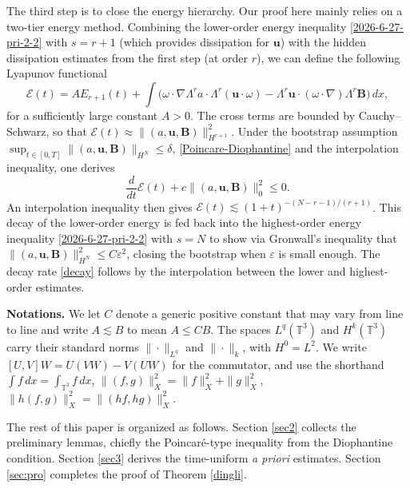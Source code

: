 \documentclass[12pt, reqno]{amsart}
\numberwithin{equation}{section}
\numberwithin{equation}{section}
\numberwithin{equation}{section}
\numberwithin{equation}{section}
\theoremstyle{remark}
\def\u{ \mathbf{u} }
\def\b{ \mathbf{B} }
\begin{document}
\medskip
The third step is to close the energy hierarchy. Our proof here mainly relies on a two-tier
energy method. Combining the  lower-order energy inequality \eqref{2026-6-27-pri-2-2} with $s=r+1$ (which provides dissipation for $\u$) with the hidden dissipation estimates from the first step (at order $r$),
we can  define the  following Lyapunov functional
\[
{\mathcal{E}(t)}=AE_{r+1}(t)+\int \Big(\omega\cdot\nabla\Lambda^{r}a\cdot\Lambda^{r}(\u\cdot\omega)-\Lambda^{r}\u\cdot(\omega\cdot\nabla)\Lambda^{r}\b\Big) \,dx,
\]
for a sufficiently large constant $A>0$.  The cross terms are bounded by
Cauchy--Schwarz, so that
$\mathcal{E}(t)\approx\|(a,\mathbf{u},\b)\|_{H^{r+1}}^2$.
Under the bootstrap assumption
$\sup_{t\in[0,T]}\|(a,\mathbf{u},\b)\|_{H^N}\leq\delta$, \eqref{Poincare-Diophantine} and the interpolation inequality, one
derives
\[
\frac{d}{dt}\mathcal{E}(t) + c\|(a,\mathbf{u},\b)\|_{0}^2 \leq 0.
\]
An interpolation inequality then gives $\mathcal{E}(t)\lesssim (1+t)^{-(N-r-1)/(r+1)}$.
This decay of the lower-order energy is fed back into the highest-order
energy inequality \eqref{2026-6-27-pri-2-2} with $s=N$ to show via Gronwall's inequality that
$\|(a,\mathbf{u},\b)\|_{H^N}^2\leq C\varepsilon^2$, closing the
bootstrap when $\varepsilon$ is small enough.  The decay rate
\eqref{decay} follows by  the interpolation between the lower and
highest-order estimates.

\medskip
\noindent\textbf{Notations.}
We let $C$ denote a generic positive constant that may vary from line to
line and write $A\lesssim B$ to mean $A\leq CB$.  The spaces
$L^q(\mathbb{T}^3)$ and $H^k(\mathbb{T}^3)$ carry their standard norms
$\|\cdot\|_{L^q}$ and $\|\cdot\|_k$, with $H^0=L^2$.  We write
$[U,V]W = U(VW)-V(UW)$ for the commutator, and use the shorthand
$\int f\,dx = \int_{\mathbb{T}^3}f\,dx$,
$\|(f,g)\|_X^2 = \|f\|_X^2+\|g\|_X^2$,
$\|h(f,g)\|_X^2 = \|(hf,hg)\|_X^2$.

\medskip
The rest of this paper is organized as follows. Section \ref{sec2} collects the preliminary lemmas, chiefly the
Poincar\'e-type inequality from the Diophantine condition.
Section \ref{sec3} derives the time-uniform \emph{a priori} estimates.
Section \ref{sec:pro} completes the proof of Theorem \ref{dingli}.
\end{document}
